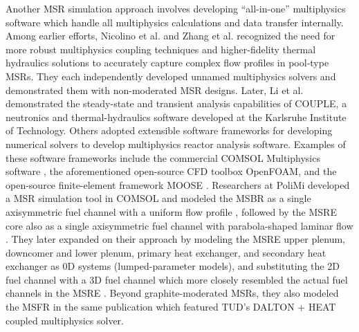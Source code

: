 Another \gls{MSR} simulation approach involves developing ``all-in-one''
multiphysics software which handle all multiphysics calculations and data
transfer internally. Among earlier efforts, Nicolino et al.
\cite{nicolino_coupled_2008} and Zhang et al. \cite{zhang_development_2009}
recognized the
need for more robust multiphysics coupling techniques and higher-fidelity
thermal hydraulics solutions to accurately capture complex flow profiles in
pool-type \glspl{MSR}. They each independently developed unnamed multiphysics
solvers and demonstrated them with non-moderated \gls{MSR}
designs. Later, Li et al. \cite{li_transient_2015} demonstrated the
steady-state and transient analysis capabilities of COUPLE, a neutronics and
thermal-hydraulics software developed at the Karlsruhe Institute of Technology.
Others adopted extensible software frameworks for developing numerical solvers
to develop multiphysics reactor analysis software. Examples of these software
frameworks include the commercial COMSOL
Multiphysics\textsuperscript{\textregistered} software
\cite{comsol_ab_comsol_nodate}, the aforementioned open-source CFD toolbox
OpenFOAM, and the open-source finite-element
framework \gls{MOOSE} \cite{gaston_physics-based_2015}. Researchers at
\gls{PoliMi} developed a \gls{MSR} simulation tool in COMSOL and
modeled the \gls{MSBR} as a single axisymmetric fuel channel with a uniform
flow profile \cite{cammi_multi-physics_2011}, followed by the \gls{MSRE} core
also as a single axisymmetric fuel channel with parabola-shaped laminar flow
\cite{cammi_dimensional_2012}. They later expanded on their approach by
modeling the \gls{MSRE} upper plenum, downcomer and lower plenum, primary heat
exchanger, and secondary heat exchanger as 0D systems (lumped-parameter
models), and substituting the 2D fuel channel with a 3D fuel channel which more
closely resembled the actual fuel channels in the \gls{MSRE}
\cite{zanetti_geometric_2015}. Beyond graphite-moderated \glspl{MSR}, they
also modeled the \gls{MSFR} in the same publication which featured \gls{TUD}'s
DALTON + HEAT coupled multiphysics solver.

